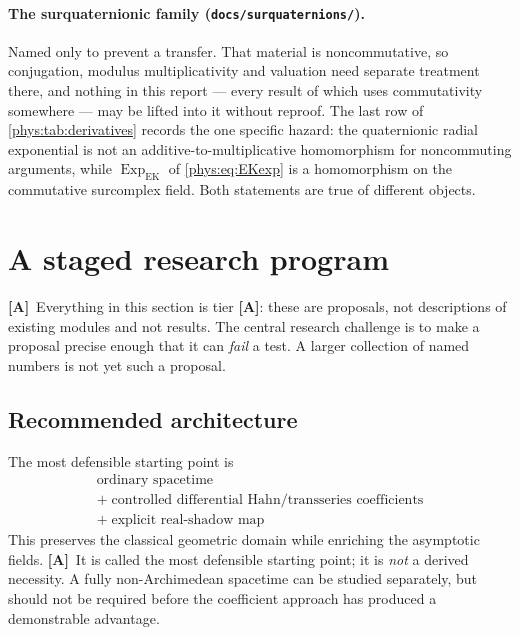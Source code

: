 \documentclass[11pt,letterpaper]{article}
\numberwithin{equation}{section}
\theoremstyle{definition}
\theoremstyle{remark}
\newcommand{\ExpEK}{\operatorname{Exp}_{\mathrm{EK}}}
\newcommand{\TA}{\textcolor{TierA}{\textsf{\bfseries[A]}}}
\begin{document}
\paragraph{The surquaternionic family (\texttt{docs/surquaternions/}).}
Named only to prevent a transfer. That material is noncommutative, so
conjugation, modulus multiplicativity and valuation need separate treatment
there, and nothing in this report --- every result of which uses commutativity
somewhere --- may be lifted into it without reproof. The last row of
\cref{phys:tab:derivatives} records the one specific hazard: the quaternionic
radial exponential is not an additive-to-multiplicative homomorphism for
noncommuting arguments, while $\ExpEK$ of \eqref{phys:eq:EKexp} is a
homomorphism on the commutative surcomplex field. Both statements are true of
different objects.

\section{A staged research program}
\label{phys:sec:program}

\TA\ Everything in this section is tier \TA: these are proposals, not
descriptions of existing modules and not results. The central research
challenge is to make a proposal precise enough that it can \emph{fail} a test.
A larger collection of named numbers is not yet such a proposal.

\subsection{Recommended architecture}
\label{phys:sub:architecture}

The most defensible starting point is
\begin{equation}\label{phys:eq:architecture}
\boxed{\begin{gathered}
\text{ordinary spacetime}\\
+\;\text{controlled differential Hahn/transseries coefficients}\\
+\;\text{explicit real-shadow map}
\end{gathered}}
\end{equation}
This preserves the classical geometric domain while enriching the asymptotic
fields. \TA\ It is called the most defensible starting point; it is \emph{not}
a derived necessity. A fully non-Archimedean spacetime can be studied
separately, but should not be required before the coefficient approach has
produced a demonstrable advantage.
\end{document}
